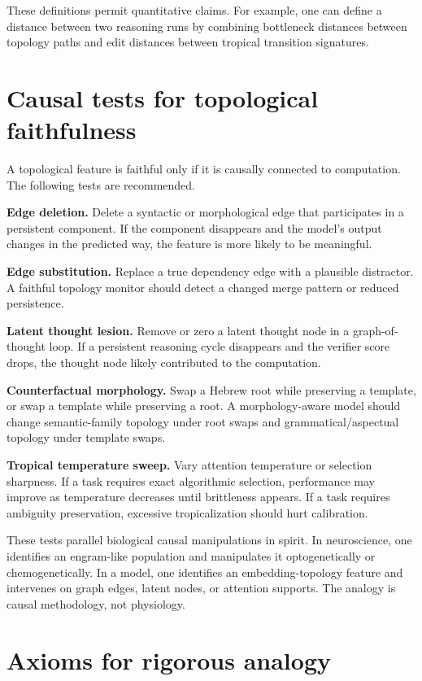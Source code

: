\documentclass[11pt]{article}
\newcommand{\1}{\mathbf{1}}
\begin{document}
These definitions permit quantitative claims. For example, one can define a distance between two reasoning runs by combining bottleneck distances between topology paths and edit distances between tropical transition signatures.

\section{Causal tests for topological faithfulness}

A topological feature is faithful only if it is causally connected to computation. The following tests are recommended.

\textbf{Edge deletion.} Delete a syntactic or morphological edge that participates in a persistent component. If the component disappears and the model's output changes in the predicted way, the feature is more likely to be meaningful.

\textbf{Edge substitution.} Replace a true dependency edge with a plausible distractor. A faithful topology monitor should detect a changed merge pattern or reduced persistence.

\textbf{Latent thought lesion.} Remove or zero a latent thought node in a graph-of-thought loop. If a persistent reasoning cycle disappears and the verifier score drops, the thought node likely contributed to the computation.

\textbf{Counterfactual morphology.} Swap a Hebrew root while preserving a template, or swap a template while preserving a root. A morphology-aware model should change semantic-family topology under root swaps and grammatical/aspectual topology under template swaps.

\textbf{Tropical temperature sweep.} Vary attention temperature or selection sharpness. If a task requires exact algorithmic selection, performance may improve as temperature decreases until brittleness appears. If a task requires ambiguity preservation, excessive tropicalization should hurt calibration.

These tests parallel biological causal manipulations in spirit. In neuroscience, one identifies an engram-like population and manipulates it optogenetically or chemogenetically. In a model, one identifies an embedding-topology feature and intervenes on graph edges, latent nodes, or attention supports. The analogy is causal methodology, not physiology.

\section{Axioms for rigorous analogy}
\end{document}
